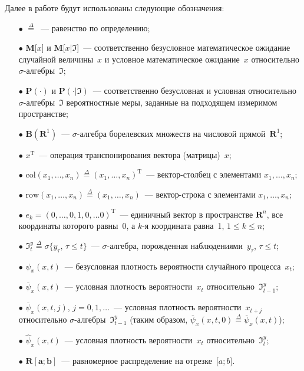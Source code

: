 \begin{multicols}{2}
  Далее в работе будут использованы следующие обозначения:
  \begin{itemize}
  \item[$\bullet$] $\overset{\Delta}{=}$~--- равенство по определению;
\item[$\bullet$] \textbf{M}[$x$] и \textbf{M}[$x\vert\Im$]~--- соответственно безусловное 
математическое ожидание случайной величины~$x$ и условное математическое 
ожидание~$x$ относительно $\sigma$-ал\-геб\-ры~$\Im$;
\item[$\bullet$] $\mathbf{P}(\cdot)$ и $\mathbf{P}(\cdot\vert\Im)$~--- соответственно 
безусловная и условная относительно $\sigma$-ал\-геб\-ры~$\Im$ вероятностные меры, 
заданные на подходящем измеримом пространстве;
\item[$\bullet$] $\mathbf{B}(\mathbf{R}^1)$~--- $\sigma$-ал\-геб\-ра борелевских 
множеств на числовой прямой~$\mathbf{R}^1$;
\item[$\bullet$] $x^{\mathrm{T}}$~--- операция транспонирования вектора (мат\-ри\-цы)~$x$;
\item[$\bullet$]  $\mathrm{col}\left(x_1, \ldots , x_n\right)\overset{\Delta}{=}(x_1, \ldots , x_n)^{\mathrm{T}}$~--- 
век\-тор-стол\-бец с элементами $x_1, \ldots , x_n$;
\item[$\bullet$] $\mathrm{row} (x_1, \ldots , x_n)\overset{\Delta}{=}(x_1, \ldots , x_n)$~--- 
век\-тор-стро\-ка с элементами $x_1, \ldots , x_n$;
\item[$\bullet$] $e_k=(0, \ldots , 0,1,0, \ldots 0)^{\mathrm{T}}$~--- единичный вектор в пространстве 
$\mathbf{R}^n$, все координаты которого равны~0, а $k$-я координата рав\-на~1, $1\leq k\leq n$;
\item[$\bullet$]  $\Im_t^y\overset{\Delta}{=}\sigma \{y_\tau, \, \tau\leq t\}$~--- 
$\sigma$-ал\-геб\-ра, порожденная наблюдениями~$y_\tau$, $\tau\leq t$;
\item[$\bullet$] $\psi_x(x,t)$~--- безусловная плотность вероятности случайного 
процесса~$x_t$;
\item[$\bullet$]  $\overline{\psi}_x(x,t)$~--- условная плотность вероятности~$x_t$ 
относительно~$\Im^y_{t-1}$;
\item[$\bullet$] $\overline{\psi}_x(x,t,j)$, $j=0,1,\ldots$~--- условная плот\-ность 
вероятности~$x_{t+j}$ относительно $\sigma$-ал\-геб\-ры~$\Im^y_{t-1}$ (таким образом, 
$\overline{\psi}_x(x,t,0)\overset{\Delta}{=} \overline{\psi}_x(x,t)$);
\item[$\bullet$] $\hat{\psi}_x(x,t)$~--- условная плотность вероятности~$x_t$ 
относительно~$\Im_t^y$;
\item[$\bullet$]  $\mathbf{R}[\mathbf{a};\mathbf{b}]$~--- равномерное распределение на 
отрезке~[$a;b$].
\end{itemize}


\end{multicols}
